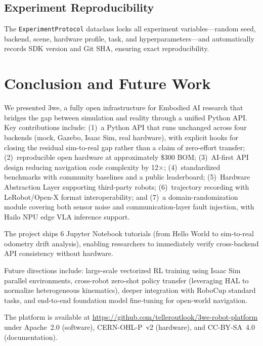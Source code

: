 \documentclass[conference]{IEEEtran}
\begin{document}
\subsection{Experiment Reproducibility}

The \texttt{ExperimentProtocol} dataclass locks all experiment variables---random seed, backend, scene, hardware profile, task, and hyperparameters---and automatically records SDK version and Git SHA, ensuring exact reproducibility.

\section{Conclusion and Future Work}

We presented 3we, a fully open infrastructure for Embodied AI research that bridges the gap between simulation and reality through a unified Python API.
Key contributions include: (1)~a Python API that runs unchanged across four backends (mock, Gazebo, Isaac Sim, real hardware), with explicit hooks for closing the residual sim-to-real gap rather than a claim of zero-effort transfer; (2)~reproducible open hardware at approximately \$300 BOM; (3)~AI-first API design reducing navigation code complexity by 12$\times$; (4)~standardized benchmarks with community baselines and a public leaderboard; (5)~Hardware Abstraction Layer supporting third-party robots; (6)~trajectory recording with LeRobot/Open-X format interoperability; and (7)~a domain-randomization module covering both sensor noise and communication-layer fault injection, with Hailo NPU edge VLA inference support.

The project ships 6 Jupyter Notebook tutorials (from Hello World to sim-to-real odometry drift analysis), enabling researchers to immediately verify cross-backend API consistency without hardware.

Future directions include: large-scale vectorized RL training using Isaac Sim parallel environments, cross-robot zero-shot policy transfer (leveraging HAL to normalize heterogeneous kinematics), deeper integration with RoboCup standard tasks, and end-to-end foundation model fine-tuning for open-world navigation.

The platform is available at \url{https://github.com/telleroutlook/3we-robot-platform} under Apache~2.0 (software), CERN-OHL-P~v2 (hardware), and CC-BY-SA~4.0 (documentation).

\balance


\end{document}
